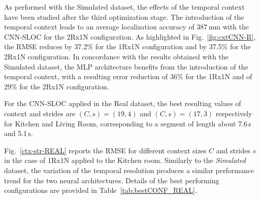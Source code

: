 \documentclass[review]{elsarticle}
\newcommand{\figref}[1]{Fig.~\ref{#1}}
\newcommand{\tableref}[1]{Table~\ref{#1}}
\begin{document}
As performed with the Simulated dataset, the effects of the temporal context have been studied after the third optimization stage.  The introduction of the temporal context leads to an average localization accuracy of 387\,mm with the CNN-SLOC for the 2Rx1N configuration. As highlighted in \figref{fig:cxtCNN-R}, the RMSE reduces by 37.2\% for the 1Rx1N configuration and by 37.5\% for the 2Rx1N configuration. In concordance with the results obtained with the Simulated dataset, the MLP architecture benefits from the introduction of the temporal context, with a resulting error reduction of 36\% for the 1Rx1N and of 29\% for the 2Rx1N configuration.


For the CNN-SLOC applied in the Real dataset, the best resulting values of context and strides are $(C,s)=(19,4)$ and $(C,s)=(17,3)$ respectively for Kitchen and Living Room, corresponding to a segment of length about 7.6\,s and 5.1\,s. 


\figref{ctx-str-REAL} reports the RMSE for different context sizes $C$ and strides $s$ in the case of 1Rx1N applied to the Kitchen room.
Similarly to the \textit{Simulated} dataset, the variation of the temporal resolution produces a similar performance trend for the two neural architectures. 
Details of the best performing configurations are provided in \tableref{tab:bestCONF_REAL}.
\end{document}
